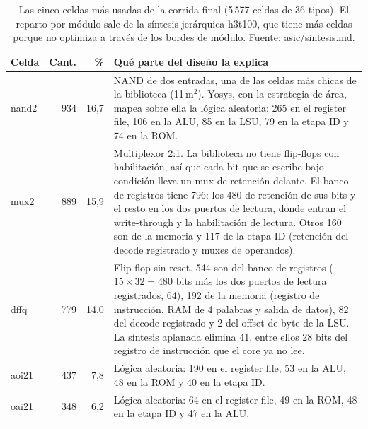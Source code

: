 \documentclass[11pt,a4paper]{article}
\DeclareRobustCommand{\sig}[1]{{\ttfamily\def\_{\textunderscore\allowbreak}#1}}
\newcommand{\umd}{\,\textmu m$^2$\xspace}
\begin{document}
\begin{table}[!htb]
\centering\small
\begin{tabular}{@{}lrrp{9.6cm}@{}}
\toprule
\textbf{Celda} & \textbf{Cant.} & \textbf{\%} & \textbf{Qué parte del diseño la explica} \\
\midrule
\sig{nand2\_1} & 934 & 16,7 & NAND de dos entradas, una de las celdas más chicas de la biblioteca (11\umd). Yosys, con la estrategia de área, mapea sobre ella la lógica aleatoria: 265 en el register file, 106 en la ALU, 85 en la LSU, 79 en la etapa ID y 74 en la ROM. \\
\addlinespace
\sig{mux2\_2} & 889 & 15,9 & Multiplexor 2:1. La biblioteca no tiene flip-flops con habilitación, así que cada bit que se escribe bajo condición lleva un mux de retención delante. El banco de registros tiene 796: los 480 de retención de sus bits y el resto en los dos puertos de lectura, donde entran el write-through y la habilitación de lectura. Otros 160 son de la memoria y 117 de la etapa ID (retención del decode registrado y muxes de operandos). \\
\addlinespace
\sig{dffq\_1} & 779 & 14,0 & Flip-flop sin reset. 544 son del banco de registros ($15 \times 32 = 480$ bits más los dos puertos de lectura registrados, 64), 192 de la memoria (registro de instrucción, RAM de 4 palabras y salida de datos), 82 del decode registrado y 2 del offset de byte de la LSU. La síntesis aplanada elimina 41, entre ellos 28 bits del registro de instrucción que el core ya no lee. \\
\addlinespace
\sig{aoi21\_1} & 437 & 7,8 & Lógica aleatoria: 190 en el register file, 53 en la ALU, 48 en la ROM y 40 en la etapa ID. \\
\addlinespace
\sig{oai21\_1} & 348 & 6,2 & Lógica aleatoria: 64 en el register file, 49 en la ROM, 48 en la etapa ID y 47 en la ALU. \\
\bottomrule
\end{tabular}
\caption{Las cinco celdas más usadas de la corrida final (5\,577 celdas de 36 tipos). El reparto por módulo sale de la síntesis jerárquica \sig{h3\_t100}, que tiene más celdas porque no optimiza a través de los bordes de módulo. Fuente: \sig{asic/sintesis.md}.}
\label{tab:celdas}
\end{table}
\end{document}
